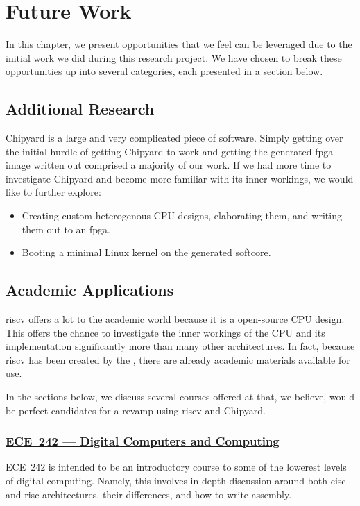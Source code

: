 \chapter{Future Work}\label{chap:Future_Work}
In this chapter, we present opportunities that we feel can be leveraged due to the initial work we did during this research project.
We have chosen to break these opportunities up into several categories, each presented in a section below.

\section{Additional Research}\label{sec:Additional_Research}
Chipyard is a large and very complicated piece of software.
Simply getting over the initial hurdle of getting Chipyard to work and getting the generated \Gls{fpga} image written out comprised a majority of our work.
If we had more time to investigate Chipyard and become more familiar with its inner workings, we would like to further explore:
\begin{itemize}
\item Creating custom heterogenous CPU designs, elaborating them, and writing them out to an \Gls{fpga}.
\item Booting a minimal Linux kernel on the generated \gls{softcore}.
\end{itemize}

\section{Academic Applications}\label{sec:Academic_Applications}
\Gls{riscv} offers a lot to the academic world because it is a open-source CPU design.
This offers the chance to investigate the inner workings of the CPU and its implementation significantly more than many other architectures.
In fact, because \Gls{riscv} has been created by the \UCB{}, there are already academic materials available for use.

In the sections below, we discuss several courses offered at \IIT{} that, we believe, would be perfect candidates for a revamp using \Gls{riscv} and Chipyard.

\subsection{\href{http://bulletin.iit.edu/search/?P=ECE 242}{ECE~242 --- Digital Computers and Computing}}\label{sec:ECE_242}
ECE~242 is intended to be an introductory course to some of the lowerest levels of digital computing.
Namely, this involves in-depth discussion around both \Gls{cisc} and \Gls{risc} architectures, their differences, and how to write \gls{assembly}.

